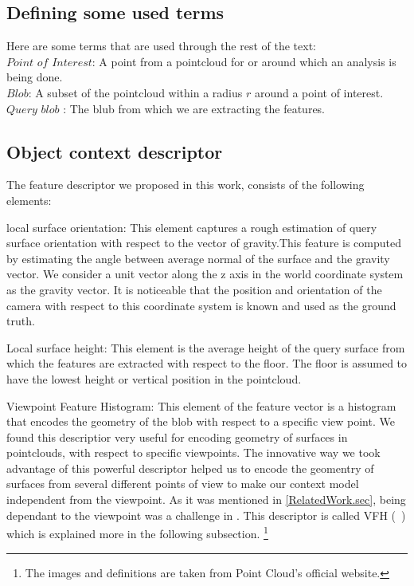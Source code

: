 \subsection{Defining some used terms}

Here are some terms that are used through the rest of the text:\\
$Point$ $of$ $Interest$: A point from a pointcloud for or around which an analysis is being done.\\
$Blob$: A subset of the pointcloud within a radius $r$ around a point of interest.\\
$Query$ $blob$ : The blub from which we are extracting the features.



\subsection{Object context descriptor}
\label{OCD.ssec}
 
The feature descriptor we proposed in this work, consists of the following elements:

local surface orientation:
This element captures a rough estimation of query surface orientation with respect to the vector of gravity.This feature is computed by estimating the angle between average normal of the surface and the gravity vector. We consider a unit vector along the z axis in the world coordinate system as the gravity vector. It is noticeable that the position and orientation of the camera with respect to this coordinate system is known and used as
the ground truth.


Local surface height:
This element is the average height of the query surface from which the features are extracted with respect to the floor. The floor is assumed to have the lowest height or vertical position in the pointcloud.
 

Viewpoint Feature Histogram:
This element of the feature vector is a histogram that encodes the geometry of the blob with respect to a specific view point. We found this descriptior very useful for encoding geometry of surfaces in pointclouds, with respect to specific viewpoints. The innovative way we took advantage of this powerful descriptor helped us to encode the geomentry of surfaces from several different points of view to make our context model independent from the viewpoint. As it was mentioned in \ref{RelatedWork.sec}, being dependant to the viewpoint was a challenge in \cite{aydemir2012_3Dcontext}.
This descriptor is called VFH (~\cite{5651280}) which is explained more in the following subsection. \footnote{The images and definitions are taken from Point Cloud's official website.}

